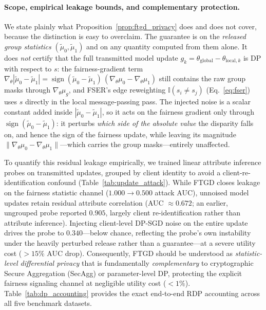 \documentclass[pdflatex,sn-mathphys-num]{sn-jnl}
\theoremstyle{thmstyleone}%
\theoremstyle{thmstyletwo}%
\theoremstyle{thmstylethree}%
\begin{document}
\paragraph{Scope, empirical leakage bounds, and complementary protection.}
We state plainly what Proposition~\ref{prop:ftgd_privacy} does and does not cover, because the distinction is easy to overclaim. The guarantee is on the \emph{released group statistics} $(\tilde\mu_0,\tilde\mu_1)$ and on any quantity computed from them alone. It does \emph{not} certify that the full transmitted model update $g_k = \theta_{\text{global}} - \theta_{\text{local}, k}$ is DP with respect to $s$: the fairness-gradient term
$\nabla_\theta|\tilde\mu_0-\tilde\mu_1| = \operatorname{sign}(\tilde\mu_0-\tilde\mu_1)\,(\nabla_\theta\mu_0-\nabla_\theta\mu_1)$
still contains the raw group masks through $\nabla_\theta\mu_g$, and FSER's edge reweighting $\mathbb{I}(s_i\neq s_j)$ (Eq.~\ref{eq:fser}) uses $s$ directly in the local message-passing pass. The injected noise is a scalar constant added inside $|\tilde\mu_0-\tilde\mu_1|$, so it acts on the fairness gradient only through $\operatorname{sign}(\tilde\mu_0-\tilde\mu_1)$: it perturbs \emph{which side of the absolute value} the disparity falls on, and hence the sign of the fairness update, while leaving its magnitude $\|\nabla_\theta\mu_0-\nabla_\theta\mu_1\|$---which carries the group masks---entirely unaffected. 

To quantify this residual leakage empirically, we trained linear attribute inference probes on transmitted updates, grouped by client identity to avoid a client-re-identification confound (Table~\ref{tab:update_attack}). While FTGD closes leakage on the fairness statistic channel ($1.000 \to 0.500$ attack AUC), unnoised model updates retain residual attribute correlation (AUC $\approx 0.672$; an earlier, ungrouped probe reported $0.905$, largely client re-identification rather than attribute inference). Injecting client-level DP-SGD noise on the entire update drives the probe to $0.340$---below chance, reflecting the probe's own instability under the heavily perturbed release rather than a guarantee---at a severe utility cost ($>15\%$ AUC drop). Consequently, FTGD should be understood as \emph{statistic-level differential privacy} that is fundamentally \emph{complementary} to cryptographic Secure Aggregation (SecAgg) or parameter-level DP, protecting the explicit fairness signaling channel at negligible utility cost ($<1\%$). Table~\ref{tab:dp_accounting} provides the exact end-to-end RDP accounting across all five benchmark datasets.
\end{document}
